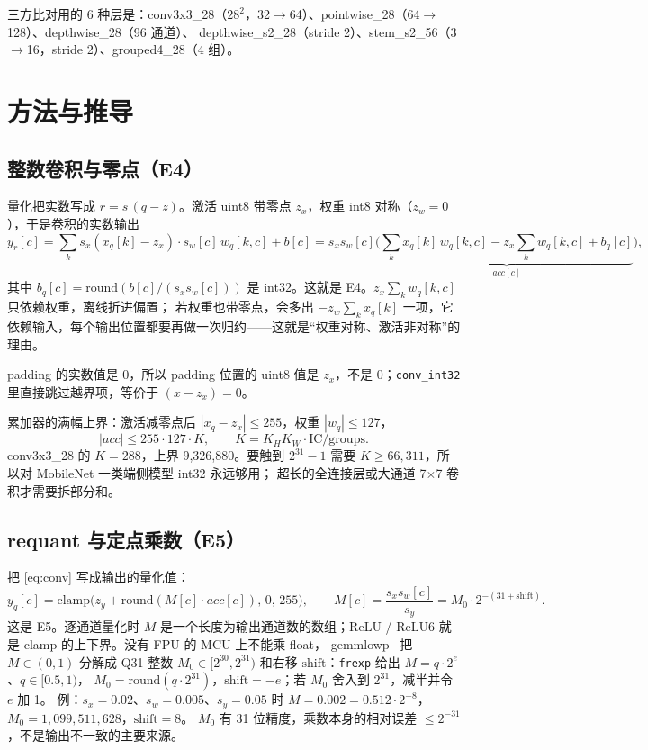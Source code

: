 \documentclass[11pt,a4paper]{ctexart}
\begin{document}
三方比对用的 6 种层是：conv3x3\_28（$28^2$，32$\to$64）、pointwise\_28（64$\to$128）、depthwise\_28（96 通道）、
depthwise\_s2\_28（stride 2）、stem\_s2\_56（3$\to$16，stride 2）、grouped4\_28（4 组）。

\section{方法与推导}\label{sec:method}

\subsection{整数卷积与零点（E4）}

量化把实数写成 $r = s\,(q - z)$。激活 uint8 带零点 $z_x$，权重 int8 对称（$z_w = 0$），于是卷积的实数输出
\begin{equation}
y_r[c] = \sum_k s_x (x_q[k]-z_x)\cdot s_w[c]\,w_q[k,c] + b[c] = s_x s_w[c]\Big(\underbrace{\sum_k x_q[k]\,w_q[k,c] - z_x\sum_k w_q[k,c] + b_q[c]}_{acc[c]}\Big),
\label{eq:conv}
\end{equation}
其中 $b_q[c] = \mathrm{round}(b[c]/(s_x s_w[c]))$ 是 int32。这就是 E4。$z_x\sum_k w_q[k,c]$ 只依赖权重，离线折进偏置；
若权重也带零点，会多出 $-z_w\sum_k x_q[k]$ 一项，它依赖输入，每个输出位置都要再做一次归约——这就是“权重对称、激活非对称”的理由。

padding 的实数值是 0，所以 padding 位置的 uint8 值是 $z_x$，不是 0；\texttt{conv\_int32} 里直接跳过越界项，等价于 $(x-z_x)=0$。

累加器的满幅上界：激活减零点后 $|x_q - z_x|\le 255$，权重 $|w_q|\le 127$，
\begin{equation}
|acc| \le 255\cdot 127\cdot K,\qquad K = K_H K_W\cdot \mathrm{IC}/\mathrm{groups}.
\label{eq:bound}
\end{equation}
conv3x3\_28 的 $K=288$，上界 9,326,880。要触到 $2^{31}-1$ 需要 $K\ge 66{,}311$，所以对 MobileNet 一类端侧模型 int32 永远够用；
超长的全连接层或大通道 7$\times$7 卷积才需要拆部分和。

\subsection{requant 与定点乘数（E5）}

把 \cref{eq:conv} 写成输出的量化值：
\begin{equation}
y_q[c] = \mathrm{clamp}\big(z_y + \mathrm{round}(M[c]\cdot acc[c]),\,0,\,255\big),\qquad M[c] = \frac{s_x s_w[c]}{s_y} = M_0\cdot 2^{-(31+\mathrm{shift})}.
\label{eq:requant}
\end{equation}
这是 E5。逐通道量化时 $M$ 是一个长度为输出通道数的数组；ReLU / ReLU6 就是 clamp 的上下界。没有 FPU 的 MCU 上不能乘 float，
gemmlowp~\cite{jacob2018} 把 $M\in(0,1)$ 分解成 Q31 整数 $M_0\in[2^{30},2^{31})$ 和右移 $\mathrm{shift}$：\texttt{frexp} 给出 $M = q\cdot 2^{e}$、$q\in[0.5,1)$，
$M_0 = \mathrm{round}(q\cdot 2^{31})$，$\mathrm{shift} = -e$；若 $M_0$ 舍入到 $2^{31}$，减半并令 $e$ 加 1。
例：$s_x=0.02$、$s_w=0.005$、$s_y=0.05$ 时 $M=0.002=0.512\cdot 2^{-8}$，$M_0=1{,}099{,}511{,}628$，$\mathrm{shift}=8$。
$M_0$ 有 31 位精度，乘数本身的相对误差 $\le 2^{-31}$，不是输出不一致的主要来源。
\end{document}
